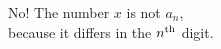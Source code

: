 \documentclass{article}
\begin{document}
\begin{preview}

No!  The number $x$ is not $a_n$, \\
\null\quad because it differs in the $n^{\mbox{\scriptsize th}}$ digit.

\end{preview}
\end{document}
